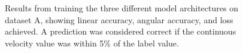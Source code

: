 \documentclass{article}
\begin{document}
\begin{figure}
  \hfill
  \par
  \hfill
  \hfill
  \caption{Results from training the three different model architectures on dataset A, showing linear accuracy, angular accuracy, and loss achieved. A prediction was considered correct if the continuous velocity value was within 5\% of the label value.}
  \label{fig:training_results}
\end{figure}
\end{document}

